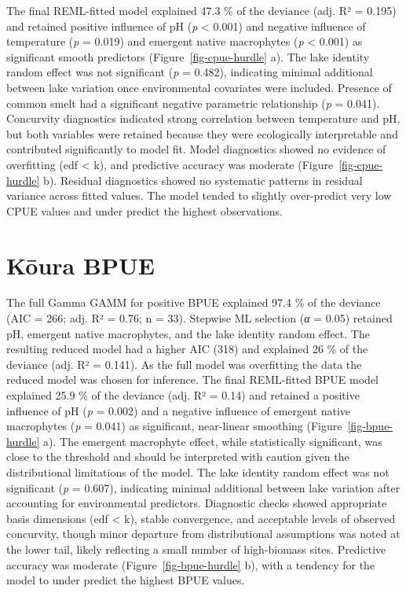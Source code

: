 \documentclass[
  12pt,
  a4paper,
]{scrbook}
\begin{document}
The final REML-fitted model explained 47.3 \% of the deviance (adj. R² =
0.195) and retained positive influence of pH (\emph{p} \textless{}
0.001) and negative influence of temperature (\emph{p} = 0.019) and
emergent native macrophytes (\emph{p} \textless{} 0.001) as significant
smooth predictors (Figure~\ref{fig-cpue-hurdle} a). The lake identity
random effect was not significant (\emph{p} = 0.482), indicating minimal
additional between lake variation once environmental covariates were
included. Presence of common smelt had a significant negative parametric
relationship (\emph{p} = 0.041). Concurvity diagnostics indicated strong
correlation between temperature and pH, but both variables were retained
because they were ecologically interpretable and contributed
significantly to model fit. Model diagnostics showed no evidence of
overfitting (edf \textless{} k), and predictive accuracy was moderate
(Figure~\ref{fig-cpue-hurdle} b). Residual diagnostics showed no
systematic patterns in residual variance across fitted values. The model
tended to slightly over-predict very low CPUE values and under predict
the highest observations.

\section{Kōura BPUE}\label{kux14dura-bpue}

The full Gamma GAMM for positive BPUE explained 97.4 \% of the deviance
(AIC = 266; adj. R² = 0.76; n = 33). Stepwise ML selection (\emph{α} =
0.05) retained pH, emergent native macrophytes, and the lake identity
random effect. The resulting reduced model had a higher AIC (318) and
explained 26 \% of the deviance (adj. R² = 0.141). As the full model was
overfitting the data the reduced model was chosen for inference. The
final REML-fitted BPUE model explained 25.9 \% of the deviance (adj. R²
= 0.14) and retained a positive influence of pH (\emph{p} = 0.002) and a
negative influence of emergent native macrophytes (\emph{p} = 0.041) as
significant, near-linear smoothing (Figure~\ref{fig-bpue-hurdle} a). The
emergent macrophyte effect, while statistically significant, was close
to the threshold and should be interpreted with caution given the
distributional limitations of the model. The lake identity random effect
was not significant (\emph{p} = 0.607), indicating minimal additional
between lake variation after accounting for environmental predictors.
Diagnostic checks showed appropriate basis dimensions (edf \textless{}
k), stable convergence, and acceptable levels of observed concurvity,
though minor departure from distributional assumptions was noted at the
lower tail, likely reflecting a small number of high-biomass sites.
Predictive accuracy was moderate (Figure~\ref{fig-bpue-hurdle} b), with
a tendency for the model to under predict the highest BPUE values.
\end{document}
